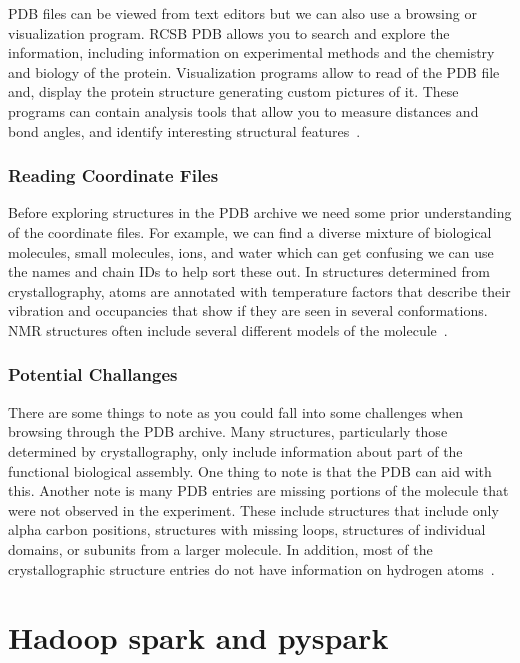 \documentclass{report}
\begin{document}
PDB files can be viewed from text editors but we can also use a browsing or visualization program. RCSB PDB allows you to search and explore the information, including information on experimental methods and the chemistry and biology of the protein. Visualization programs allow to read of the PDB file and, display the protein structure generating custom pictures of it. These programs can contain analysis tools that allow you to measure distances and bond angles, and identify interesting structural features~\cite{noauthor_pdb101_nodate}.
\subsubsection{Reading Coordinate Files}

Before exploring structures in the PDB archive we need some prior understanding of the coordinate files. For example, we can find a diverse mixture of biological molecules, small molecules, ions, and water which can get confusing we can use the names and chain IDs to help sort these out. In structures determined from crystallography, atoms are annotated with temperature factors that describe their vibration and occupancies that show if they are seen in several conformations. NMR structures often include several different models of the molecule~\cite{noauthor_pdb101_nodate}.

\subsubsection{Potential Challanges}

There are some things to note as you could fall into some challenges when browsing through the PDB archive. Many structures, particularly those determined by crystallography, only include information about part of the functional biological assembly. One thing to note is that the PDB can aid with this. Another note is many PDB entries are missing portions of the molecule that were not observed in the experiment. These include structures that include only alpha carbon positions, structures with missing loops, structures of individual domains, or subunits from a larger molecule. In addition, most of the crystallographic structure entries do not have information on hydrogen atoms~\cite{noauthor_pdb101_nodate}.


\section{Hadoop spark and pyspark}
\end{document}

